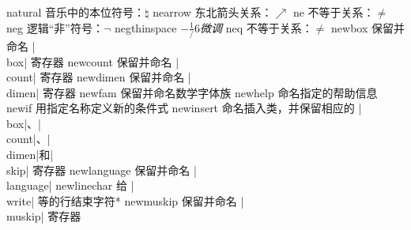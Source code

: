 \capcs natural {音乐中的本位符号：$\natural$}{}{}
\capcs nearrow {东北箭头关系：$\nearrow$}{}{}
\capcs ne {不等于关系：$\ne$}{}{}
\capcs neg {逻辑“非”符号：$\neg$}{}{}
\capcs negthinspace {$-\frac1/6$\em 微调}{}{}
\capcs neq {不等于关系：$\neq$}{}{}
\capcs newbox {保留并命名 |\\box| 寄存器}{}{\@newbox}
\capcs newcount {保留并命名 |\\count| 寄存器}{}{\@newcount}
\capcs newdimen {保留并命名 |\\dimen| 寄存器}{}{\@newdimen}
\capcs newfam {保留并命名数学字体族}{}{\@newfam}
\capcs newhelp {命名指定的帮助信息}{}{\@newhelp}
\capcs newif {用指定名称定义新的条件式}{}{\@newif}
\capcs newinsert {命名插入类，并保留相应的 |\\box|、|\\count|、|\\dimen|和|\\skip| 寄存器}{}{\@newinsert}
\capcs newlanguage {保留并命名 |\\language|}{}{\@newlanguage}
\capcs newlinechar {给 |\\write| 等的行结束字符}*{}
\capcs newmuskip {保留并命名 |\\muskip| 寄存器}{}{\@newmuskip}
